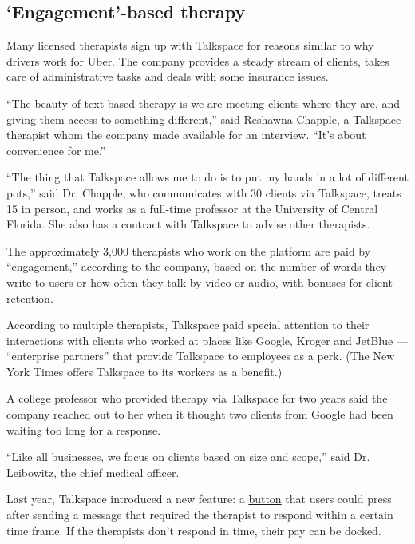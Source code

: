 \hypertarget{engagement-based-therapy}{%
\subsection{`Engagement'-based therapy}\label{engagement-based-therapy}}

Many licensed therapists sign up with Talkspace for reasons similar to
why drivers work for Uber. The company provides a steady stream of
clients, takes care of administrative tasks and deals with some
insurance issues.

``The beauty of text-based therapy is we are meeting clients where they
are, and giving them access to something different,'' said Reshawna
Chapple, a Talkspace therapist whom the company made available for an
interview. ``It's about convenience for me.''

``The thing that Talkspace allows me to do is to put my hands in a lot
of different pots,'' said Dr. Chapple, who communicates with 30 clients
via Talkspace, treats 15 in person, and works as a full-time professor
at the University of Central Florida. She also has a contract with
Talkspace to advise other therapists.

The approximately 3,000 therapists who work on the platform are paid by
``engagement,'' according to the company, based on the number of words
they write to users or how often they talk by video or audio, with
bonuses for client retention.

According to multiple therapists, Talkspace paid special attention to
their interactions with clients who worked at places like Google, Kroger
and JetBlue --- ``enterprise partners'' that provide Talkspace to
employees as a perk. (The New York Times offers Talkspace to its workers
as a benefit.)

A college professor who provided therapy via Talkspace for two years
said the company reached out to her when it thought two clients from
Google had been waiting too long for a response.

``Like all businesses, we focus on clients based on size and scope,''
said Dr. Leibowitz, the chief medical officer.

Last year, Talkspace introduced a new feature: a
\href{https://help.talkspace.com/hc/en-us/articles/360029308131-How-does-Guaranteed-Response-Time-work-}{button}
that users could press after sending a message that required the
therapist to respond within a certain time frame. If the therapists
don't respond in time, their pay can be docked.

